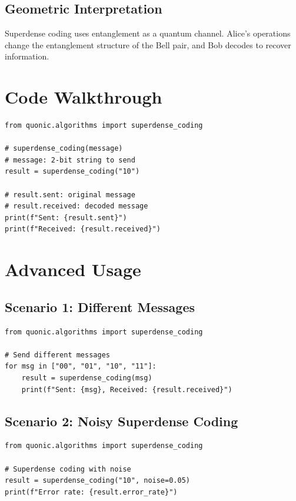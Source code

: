 \documentclass[12pt,a4paper]{article}
\begin{document}
\subsection{Geometric Interpretation}

Superdense coding uses entanglement as a quantum channel. Alice's operations change the entanglement structure of the Bell pair, and Bob decodes to recover information.

\section{Code Walkthrough}

\begin{verbatim}
from quonic.algorithms import superdense_coding

# superdense_coding(message)
# message: 2-bit string to send
result = superdense_coding("10")

# result.sent: original message
# result.received: decoded message
print(f"Sent: {result.sent}")
print(f"Received: {result.received}")
\end{verbatim}

\section{Advanced Usage}

\subsection{Scenario 1: Different Messages}

\begin{verbatim}
from quonic.algorithms import superdense_coding

# Send different messages
for msg in ["00", "01", "10", "11"]:
    result = superdense_coding(msg)
    print(f"Sent: {msg}, Received: {result.received}")
\end{verbatim}

\subsection{Scenario 2: Noisy Superdense Coding}

\begin{verbatim}
from quonic.algorithms import superdense_coding

# Superdense coding with noise
result = superdense_coding("10", noise=0.05)
print(f"Error rate: {result.error_rate}")
\end{verbatim}
\end{document}
